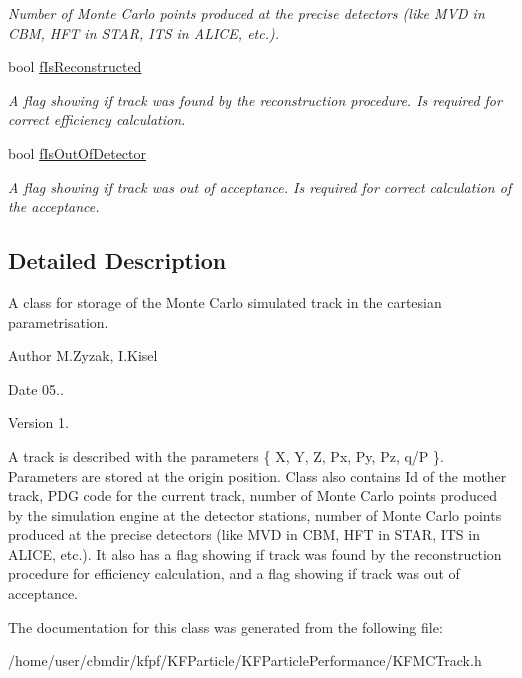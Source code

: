 \begin{DoxyCompactItemize}
\begin{DoxyCompactList}\small\item\em Number of Monte Carlo points produced at the precise detectors (like M\+VD in C\+BM, H\+FT in S\+T\+AR, I\+TS in A\+L\+I\+CE, etc.). \end{DoxyCompactList}\item 
bool \hyperlink{classKFMCTrack_a7cfb459a6c51ee52e610d2405056eb9f}{f\+Is\+Reconstructed}\hypertarget{classKFMCTrack_a7cfb459a6c51ee52e610d2405056eb9f}{}\label{classKFMCTrack_a7cfb459a6c51ee52e610d2405056eb9f}

\begin{DoxyCompactList}\small\item\em A flag showing if track was found by the reconstruction procedure. Is required for correct efficiency calculation. \end{DoxyCompactList}\item 
bool \hyperlink{classKFMCTrack_a6375b38e77037425fb1499299c286fc4}{f\+Is\+Out\+Of\+Detector}\hypertarget{classKFMCTrack_a6375b38e77037425fb1499299c286fc4}{}\label{classKFMCTrack_a6375b38e77037425fb1499299c286fc4}

\begin{DoxyCompactList}\small\item\em A flag showing if track was out of acceptance. Is required for correct calculation of the acceptance. \end{DoxyCompactList}\end{DoxyCompactItemize}


\subsection{Detailed Description}
A class for storage of the Monte Carlo simulated track in the cartesian parametrisation. 

\begin{DoxyAuthor}{Author}
M.\+Zyzak, I.\+Kisel 
\end{DoxyAuthor}
\begin{DoxyDate}{Date}
05.. 
\end{DoxyDate}
\begin{DoxyVersion}{Version}
1.
\end{DoxyVersion}
A track is described with the parameters \{ X, Y, Z, Px, Py, Pz, q/P \}. Parameters are stored at the origin position. Class also contains Id of the mother track, P\+DG code for the current track, number of Monte Carlo points produced by the simulation engine at the detector stations, number of Monte Carlo points produced at the precise detectors (like M\+VD in C\+BM, H\+FT in S\+T\+AR, I\+TS in A\+L\+I\+CE, etc.). It also has a flag showing if track was found by the reconstruction procedure for efficiency calculation, and a flag showing if track was out of acceptance. 

The documentation for this class was generated from the following file\+:\begin{DoxyCompactItemize}
\item 
/home/user/cbmdir/kfpf/\+K\+F\+Particle/\+K\+F\+Particle\+Performance/K\+F\+M\+C\+Track.\+h\end{DoxyCompactItemize}

